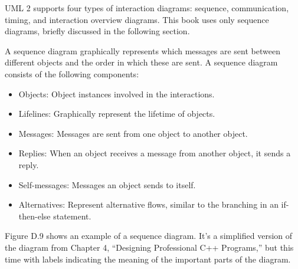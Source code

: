 
UML 2 supports four types of interaction diagrams: sequence, communication, timing, and interaction overview diagrams. This book uses only sequence diagrams, briefly discussed in the following section.


A sequence diagram graphically represents which messages are sent between different objects and the order in which these are sent. A sequence diagram consists of the following components:

\begin{itemize}
\item
Objects: Object instances involved in the interactions.

\item
Lifelines: Graphically represent the lifetime of objects.

\item
Messages: Messages are sent from one object to another object.

\item
Replies: When an object receives a message from another object, it sends a reply.

\item
Self-messages: Messages an object sends to itself.

\item
Alternatives: Represent alternative flows, similar to the branching in an if-then-else statement.
\end{itemize}

Figure D.9 shows an example of a sequence diagram. It’s a simplified version of the diagram from Chapter 4, “Designing Professional C++ Programs,” but this time with labels indicating the meaning of the important parts of the diagram.









